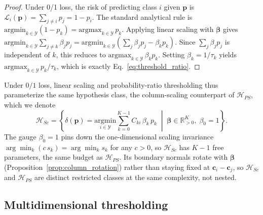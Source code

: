 \begin{proof}
    Under 0/1 loss, the risk of predicting class $i$ given $\mathbf{p}$ is $\mathcal{L}_i(\mathbf{p}) = \sum_{j \neq i} p_j = 1 - p_i$. The standard analytical rule is $\mathrm{argmin}_{k \in \mathcal{Y}}(1 - p_k) = \mathrm{argmax}_{k \in \mathcal{Y}}\, p_k$. Applying linear scaling with $\boldsymbol{\beta}$ gives $\mathrm{argmin}_{k \in \mathcal{Y}}\sum_{j \neq k} \beta_j p_j = \mathrm{argmin}_{k \in \mathcal{Y}}(\sum_j \beta_j p_j - \beta_k p_k)$. Since $\sum_j \beta_j p_j$ is independent of $k$, this reduces to $\mathrm{argmax}_{k \in \mathcal{Y}}\, \beta_k p_k$. Setting $\beta_k = 1/\tau_k$ yields $\mathrm{argmax}_{k \in \mathcal{Y}}\, p_k / \tau_k$, which is exactly Eq.~\ref{eq:threshold_ratio}.
\end{proof}

Under $0/1$ loss, linear scaling and probability-ratio thresholding thus parameterize the same hypothesis class, the column-scaling counterpart of $\mathcal{H}_{PS}$, which we denote
\begin{equation}\label{eq:hsc_def}
    \mathcal{H}_{Sc} = \left\{ \delta(\mathbf{p}) = \underset{i \in \mathcal{Y}}{\mathrm{argmin}} \sum_{k=0}^{K-1} C_{ki}\, \beta_k\, p_k \;\middle|\; \boldsymbol{\beta} \in \mathbb{R}_{>0}^K,\; \beta_0 = 1 \right\}.
\end{equation}
The gauge $\beta_0 = 1$ pins down the one-dimensional scaling invariance $\arg\min_k(c\, s_k) = \arg\min_k s_k$ for any $c > 0$, so $\mathcal{H}_{Sc}$ has $K-1$ free parameters, the same budget as $\mathcal{H}_{PS}$. Its boundary normals rotate with $\boldsymbol{\beta}$ (Proposition~\ref{prop:column_rotation}) rather than staying fixed at $\mathbf{c}_i - \mathbf{c}_j$, so $\mathcal{H}_{Sc}$ and $\mathcal{H}_{PS}$ are distinct restricted classes at the same complexity, not nested.

\subsection{Multidimensional thresholding}\label{sec:multidim_thresholding}

